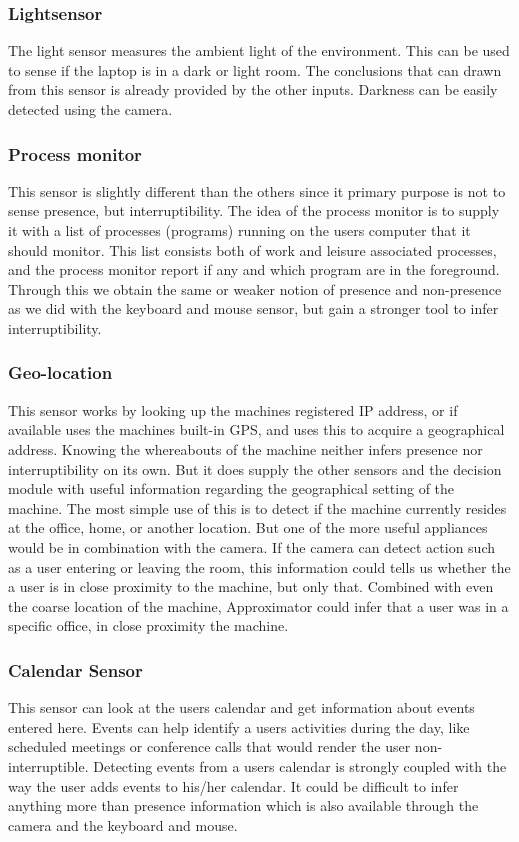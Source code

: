 \documentclass{sigchi}
\begin{document}
\subsubsection{Lightsensor}
The light sensor measures the ambient light of the environment.
This can be used to sense if the laptop is in a dark or light room.
The conclusions that can drawn from this sensor is already provided by the other inputs.
Darkness can be easily detected using the camera.

\subsubsection{Process monitor}
This sensor is slightly different than the others since it primary purpose is not to sense presence, but interruptibility.
The idea of the process monitor is to supply it with a list of processes (programs) running on the users computer that it should monitor.
This list consists both of work and leisure associated processes, and the process monitor report if any and which program are in the foreground. %
Through this we obtain the same or weaker notion of presence and non-presence as we did with the keyboard and mouse sensor, but gain a stronger tool to infer interruptibility.

\subsubsection{Geo-location}
This sensor works by looking up the machines registered IP address, or if available uses the machines built-in GPS, and uses this to acquire a geographical address.
Knowing the whereabouts of the machine neither infers presence nor interruptibility on its own.
But it does supply the other sensors and the decision module with useful information regarding the geographical setting of the machine.
The most simple use of this is to detect if the machine currently resides at the office, home, or another location.
But one of the more useful appliances would be in combination with the camera.
If the camera can detect action such as a user entering or leaving the room, this information could tells us whether the a user is in close proximity to the machine, but only that.
Combined with even the coarse location of the machine, Approximator could infer that a user was in a specific office, in close proximity the machine.

\subsubsection{Calendar Sensor}
This sensor can look at the users calendar and get information about events entered here.
Events can help identify a users activities during the day, like scheduled meetings or conference calls that would render the user non-interruptible.
Detecting events from a users calendar is strongly coupled with the way the user adds events to his/her calendar.
It could be difficult to infer anything more than presence information which is also available through the camera and the keyboard and mouse.
\end{document}
